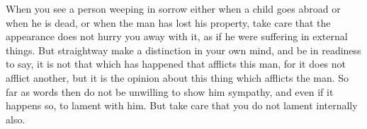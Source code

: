 When you see a person weeping in sorrow either when a child goes abroad or when
he  is dead,  or  when  the man  has  lost his  property,  take  care that  the
appearance does not hurry you away with it, as if he were suffering in external
things.  But  straightway make  a  distinction  in your  own  mind,  and be  in
readiness to say, it is not that which has happened that afflicts this man, for
it does  not afflict  another, but  it is  the opinion  about this  thing which
afflicts  the man.  So  far as  words  then do  not be  unwilling  to show  him
sympathy, and even if it happens so, to lament with him. But take care that you
do not lament internally also.
